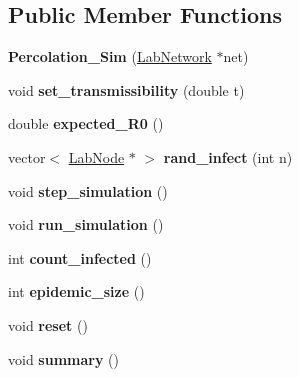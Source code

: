 \subsection*{Public Member Functions}
\begin{DoxyCompactItemize}
\item 
\hypertarget{classstudy_1_1_percolation___sim_aea79924947fc2347560b81115a78e6d1}{{\bfseries Percolation\-\_\-\-Sim} (\hyperlink{classelps_1_1_lab_network}{Lab\-Network} $\ast$net)}\label{classstudy_1_1_percolation___sim_aea79924947fc2347560b81115a78e6d1}

\item 
\hypertarget{classstudy_1_1_percolation___sim_a8b7d92c7236dd8354fe0f10f174d4fde}{void {\bfseries set\-\_\-transmissibility} (double t)}\label{classstudy_1_1_percolation___sim_a8b7d92c7236dd8354fe0f10f174d4fde}

\item 
\hypertarget{classstudy_1_1_percolation___sim_acf6db39bca6f1364f5b82267d4be0868}{double {\bfseries expected\-\_\-\-R0} ()}\label{classstudy_1_1_percolation___sim_acf6db39bca6f1364f5b82267d4be0868}

\item 
\hypertarget{classstudy_1_1_percolation___sim_a24234b5798fc6928f37a73e08e252e5a}{vector$<$ \hyperlink{classelps_1_1_lab_node}{Lab\-Node} $\ast$ $>$ {\bfseries rand\-\_\-infect} (int n)}\label{classstudy_1_1_percolation___sim_a24234b5798fc6928f37a73e08e252e5a}

\item 
\hypertarget{classstudy_1_1_percolation___sim_a1021ed4c69f97ee07bb485d11b014c7c}{void {\bfseries step\-\_\-simulation} ()}\label{classstudy_1_1_percolation___sim_a1021ed4c69f97ee07bb485d11b014c7c}

\item 
\hypertarget{classstudy_1_1_percolation___sim_ad2f15ed7cb39ce32f8c03269105d5559}{void {\bfseries run\-\_\-simulation} ()}\label{classstudy_1_1_percolation___sim_ad2f15ed7cb39ce32f8c03269105d5559}

\item 
\hypertarget{classstudy_1_1_percolation___sim_a7afc40edd2639512034c25c7d85bdd55}{int {\bfseries count\-\_\-infected} ()}\label{classstudy_1_1_percolation___sim_a7afc40edd2639512034c25c7d85bdd55}

\item 
\hypertarget{classstudy_1_1_percolation___sim_a4e29685b995198689b1934f1ba94ff41}{int {\bfseries epidemic\-\_\-size} ()}\label{classstudy_1_1_percolation___sim_a4e29685b995198689b1934f1ba94ff41}

\item 
\hypertarget{classstudy_1_1_percolation___sim_a5d04918ae77e4756f8eec5578e81395b}{void {\bfseries reset} ()}\label{classstudy_1_1_percolation___sim_a5d04918ae77e4756f8eec5578e81395b}

\item 
\hypertarget{classstudy_1_1_percolation___sim_a5b0a185838316d8ec57ae02a61e6d76a}{void {\bfseries summary} ()}\label{classstudy_1_1_percolation___sim_a5b0a185838316d8ec57ae02a61e6d76a}

\end{DoxyCompactItemize}
